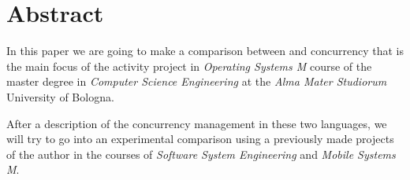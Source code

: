 \section*{Abstract}

In this paper we are going to make a comparison between \Kotlin and \Go concurrency that is the main focus of the activity project in \textit{Operating Systems M} course of the master degree in \textit{Computer Science Engineering} at the \textit{Alma Mater Studiorum} University of Bologna.

After a description of the concurrency management in these two languages, we will try to go into an experimental comparison using a previously made projects of the author in the courses of \textit{Software System Engineering} and \textit{Mobile Systems M}. 